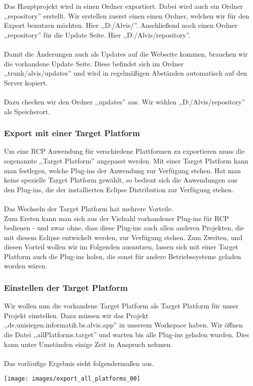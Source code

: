 \documentclass[10pt,a4paper]{article}
\begin{document}
Das Hauptprojekt wird in einen Ordner exportiert. Dabei wird auch ein Ordner ,,repository'' erstellt. Wir erstellen zuerst einen einen Ordner, welchen wir für den Export benutzen möchten. Hier ,,D:/Alvis/''. Anschließend noch einen Ordner ,,repository'' für die Update Seite. Hier ,,D:/Alvis/repository''.
\\ \\
Damit die Änderungen auch als Updates auf die Webseite kommen, brauchen wir die vorhandene Update Seite. Diese befindet sich im Ordner ,,trunk/alvis/updates'' und wird in regelmäßigen Abständen automatisch auf den Server kopiert. 
\\ \\
Dazu checken wir den Ordner ,,updates'' aus. Wir wählen ,,D:/Alvis/repository'' als Speicherort.
\subsubsection{Export mit einer Target Platform}
Um eine RCP Anwendung für verschiedene Plattformen zu exportieren muss die sogenannte ,,Target Platform'' angepasst werden. Mit einer Target Platform kann man festlegen, welche Plug-ins der Anwendung zur Verfügung stehen. Hat man keine spezielle Target Platform gewählt, so bedient sich die Anwendungen aus den Plug-ins, die der installierten Eclipse Distribution zur Verfügung stehen.
\\
\\
Das Wechseln der Target Platform hat mehrere Vorteile. \\
Zum Ersten kann man sich aus der Vielzahl vorhandener Plug-ins für RCP bedienen - und zwar ohne, dass diese Plug-ins auch allen anderen Projekten, die mit diesem Eclipse entwickelt werden, zur Verfügung stehen.
Zum Zweiten, und diesen Vorteil wollen wir im Folgenden ausnutzen, lassen sich mit einer Target Platform auch die Plug-ins holen, die sonst für andere Betriebssysteme geladen worden wären.

\subsubsection{Einstellen der Target Platform}
Wir wollen nun die vorhandene Target Platform als Target Platform für unser Projekt einstellen. Dazu müssen wir das Projekt\\
,,de.unisiegen.informatik.bs.alvis.app'' in unserem Workspace haben. Wir öffnen die Datei ,,allPlatforms.target'' und warten bis alle Plug-ins geladen wurden. Dies kann unter Umständen einige Zeit in Anspruch nehmen. 
\\ \\
Das vorläufige Ergebnis sieht folgendermaßen aus.
\begin{center}
\texttt{[image: images/export\_all\_platforms\_00]}
\end{center}
\end{document}
